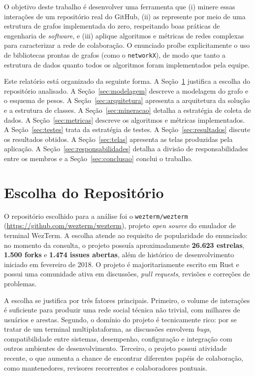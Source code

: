 \documentclass[12pt]{article}
\begin{document}
O objetivo deste trabalho é desenvolver uma ferramenta que (i) minere essas
interações de um repositório real do GitHub, (ii) as represente por meio de uma
estrutura de grafos implementada do zero, respeitando boas práticas de
engenharia de \emph{software}, e (iii) aplique algoritmos e métricas de redes
complexas para caracterizar a rede de colaboração. O enunciado proíbe
explicitamente o uso de bibliotecas prontas de grafos (como o \texttt{networkX}),
de modo que tanto a estrutura de dados quanto todos os algoritmos foram
implementados pela equipe.

Este relatório está organizado da seguinte forma. A
Seção~\ref{sec:repositorio} justifica a escolha do repositório analisado. A
Seção~\ref{sec:modelagem} descreve a modelagem do grafo e o esquema de pesos. A
Seção~\ref{sec:arquitetura} apresenta a arquitetura da solução e a estrutura de
classes. A Seção~\ref{sec:mineracao} detalha a estratégia de coleta de dados. A
Seção~\ref{sec:metricas} descreve os algoritmos e métricas implementados. A
Seção~\ref{sec:testes} trata da estratégia de testes. A
Seção~\ref{sec:resultados} discute os resultados obtidos. A
Seção~\ref{sec:telas} apresenta as telas produzidas pela aplicação. A
Seção~\ref{sec:responsabilidades} detalha a divisão de responsabilidades entre os
membros e a Seção~\ref{sec:conclusao} conclui o trabalho.

\section{Escolha do Repositório}
\label{sec:repositorio}

O repositório escolhido para a análise foi o \texttt{wezterm/wezterm}
(\url{https://github.com/wezterm/wezterm}), projeto \emph{open source} do
emulador de terminal WezTerm. A escolha atende ao requisito de popularidade do
enunciado: no momento da consulta, o projeto possuía aproximadamente
\textbf{26.623 estrelas}, \textbf{1.500 forks} e \textbf{1.474 issues abertas},
além de histórico de desenvolvimento iniciado em fevereiro de 2018. O projeto é
majoritariamente escrito em Rust e possui uma comunidade ativa em discussões,
\emph{pull requests}, revisões e correções de problemas.

A escolha se justifica por três fatores principais. Primeiro, o volume de
interações é suficiente para produzir uma rede social técnica não trivial, com
milhares de usuários e arestas. Segundo, o domínio do projeto é tecnicamente
rico: por se tratar de um terminal multiplataforma, as discussões envolvem
\emph{bugs}, compatibilidade entre sistemas, desempenho, configuração e
integração com outros ambientes de desenvolvimento. Terceiro, o projeto possui
atividade recente, o que aumenta a chance de encontrar diferentes papéis de
colaboração, como mantenedores, revisores recorrentes e colaboradores pontuais.
\end{document}
